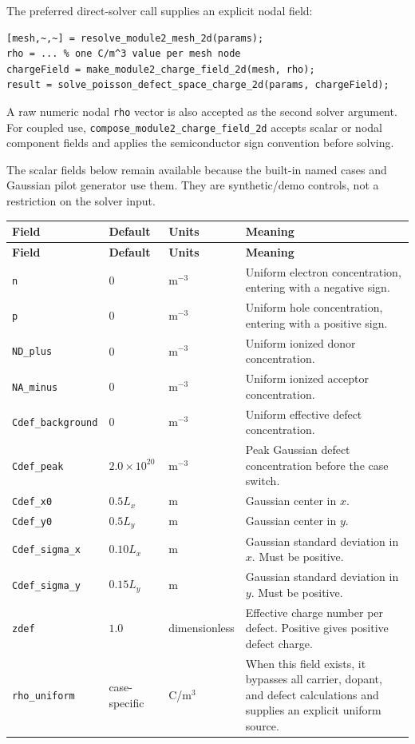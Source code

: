 \documentclass[11pt]{article}
\begin{document}
The preferred direct-solver call supplies an explicit nodal field:
\begin{lstlisting}[style=projectmatlab]
[mesh,~,~] = resolve_module2_mesh_2d(params);
rho = ... % one C/m^3 value per mesh node
chargeField = make_module2_charge_field_2d(mesh, rho);
result = solve_poisson_defect_space_charge_2d(params, chargeField);
\end{lstlisting}
A raw numeric nodal \texttt{rho} vector is also accepted as the second solver argument. For coupled use, \texttt{compose\_module2\_charge\_field\_2d} accepts scalar or nodal component fields and applies the semiconductor sign convention before solving.

The scalar fields below remain available because the built-in named cases and Gaussian pilot generator use them. They are synthetic/demo controls, not a restriction on the solver input.


\begin{longtable}{p{} p{} p{} p{}}
\toprule
\textbf{Field} & \textbf{Default} & \textbf{Units} & \textbf{Meaning} \\
\midrule
\endfirsthead
\toprule
\textbf{Field} & \textbf{Default} & \textbf{Units} & \textbf{Meaning} \\
\midrule
\endhead
\texttt{n} & $0$ & m$^{-3}$ & Uniform electron concentration, entering with a negative sign. \\
\texttt{p} & $0$ & m$^{-3}$ & Uniform hole concentration, entering with a positive sign. \\
\texttt{ND\_plus} & $0$ & m$^{-3}$ & Uniform ionized donor concentration. \\
\texttt{NA\_minus} & $0$ & m$^{-3}$ & Uniform ionized acceptor concentration. \\
\texttt{Cdef\_background} & $0$ & m$^{-3}$ & Uniform effective defect concentration. \\
\texttt{Cdef\_peak} & $2.0\times10^{20}$ & m$^{-3}$ & Peak Gaussian defect concentration before the case switch. \\
\texttt{Cdef\_x0} & $0.5L_x$ & m & Gaussian center in $x$. \\
\texttt{Cdef\_y0} & $0.5L_y$ & m & Gaussian center in $y$. \\
\texttt{Cdef\_sigma\_x} & $0.10L_x$ & m & Gaussian standard deviation in $x$. Must be positive. \\
\texttt{Cdef\_sigma\_y} & $0.15L_y$ & m & Gaussian standard deviation in $y$. Must be positive. \\
\texttt{zdef} & $1.0$ & dimensionless & Effective charge number per defect. Positive gives positive defect charge. \\
\texttt{rho\_uniform} & case-specific & C/m$^3$ & When this field exists, it bypasses all carrier, dopant, and defect calculations and supplies an explicit uniform source. \\
\bottomrule
\end{longtable}
\end{document}
